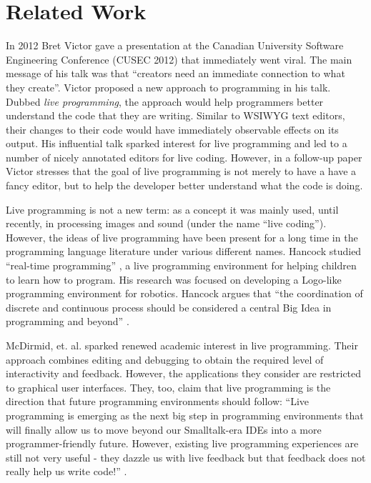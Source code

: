 \section{Related Work}
\label{sec:live}

In 2012 Bret Victor gave a presentation \cite{bretVictorVideo} at the Canadian University Software Engineering Conference (CUSEC 2012) that immediately went viral. The main message of his talk was that ``creators need an immediate connection to what they create''.
Victor proposed a new approach to programming in his talk. Dubbed  {\emph {live programming}}, the approach would help programmers better understand the code that they are writing. Similar to WSIWYG text editors, their changes to their code would have immediately observable effects on its output. His influential talk sparked interest for live programming and led to a number of nicely annotated editors for live coding. However, in a follow-up paper \cite{victor2012} Victor stresses that the goal of live programming is not merely to have a have a fancy editor, but to help the developer better understand what the code is doing.

Live programming is not a new term: as a concept it was mainly used, until recently, in processing images and sound (under the name ``live coding''). However, the ideas of live programming have been present for a long time in the programming language literature under various different names. Hancock studied ``real-time programming'' \cite{HancockPhDThesis}, a live programming environment for helping children to learn how to program. His research was focused on developing a Logo-like programming environment for robotics. Hancock argues that ``the coordination of discrete and continuous process should be considered a central Big Idea in programming and beyond'' \cite{HancockPhDThesis}.

McDirmid, et. al. \cite{McDirmid13oopsla, BurckhardtFHMMTK13_PLDI, McDirmidE14} sparked renewed academic interest in live programming. Their approach combines editing and debugging to obtain the required level of interactivity and  feedback. However, the applications they consider are restricted to graphical user interfaces. They, too, claim that live programming is the direction that  future programming environments should follow: ``Live programming is emerging as the next big step in programming environments that will finally allow us to move beyond our Smalltalk-era IDEs into a more programmer-friendly future. However, existing live programming experiences are still not very useful - they dazzle us with live feedback but that feedback does not really help us write code!'' \cite{McDirmid13oopsla}.

